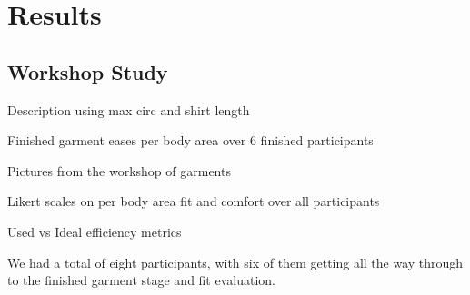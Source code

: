 \chapter{Results}

\section{Workshop Study}
Description using max circ and shirt length

Finished garment eases per body area over 6 finished participants

Pictures from the workshop of garments

Likert scales on per body area fit and comfort over all participants

Used vs Ideal efficiency metrics

We had a total of eight participants, with six of them getting all the way through to the finished garment stage and fit evaluation.

